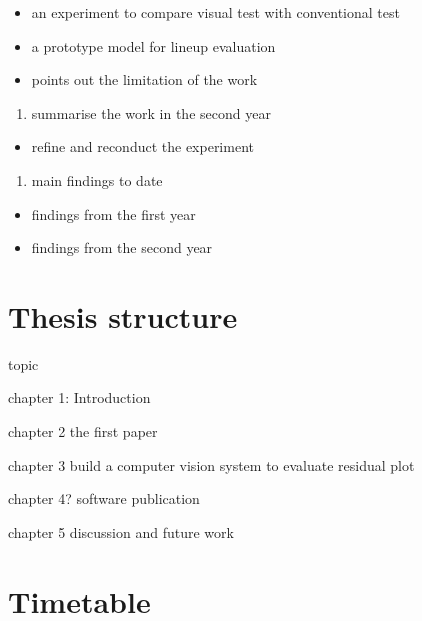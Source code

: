 \documentclass[11pt,a4paper,]{article}
\providecommand{\tightlist}{%
  \setlength{\itemsep}{0pt}\setlength{\parskip}{0pt}}
\begin{document}
\begin{itemize}
\tightlist
\item
  an experiment to compare visual test with conventional test
\item
  a prototype model for lineup evaluation
\item
  points out the limitation of the work
\end{itemize}

\begin{enumerate}
\def\labelenumi{\arabic{enumi}.}
\setcounter{enumi}{3}
\tightlist
\item
  summarise the work in the second year
\end{enumerate}

\begin{itemize}
\tightlist
\item
  refine and reconduct the experiment
\end{itemize}

\begin{enumerate}
\def\labelenumi{\arabic{enumi}.}
\setcounter{enumi}{4}
\tightlist
\item
  main findings to date
\end{enumerate}

\begin{itemize}
\tightlist
\item
  findings from the first year
\item
  findings from the second year
\end{itemize}

\hypertarget{thesis-structure}{%
\section{Thesis structure}\label{thesis-structure}}

topic

chapter 1: Introduction

chapter 2
the first paper

chapter 3
build a computer vision system to evaluate residual plot

chapter 4?
software publication

chapter 5
discussion and future work

\hypertarget{timetable}{%
\section{Timetable}\label{timetable}}
\end{document}
